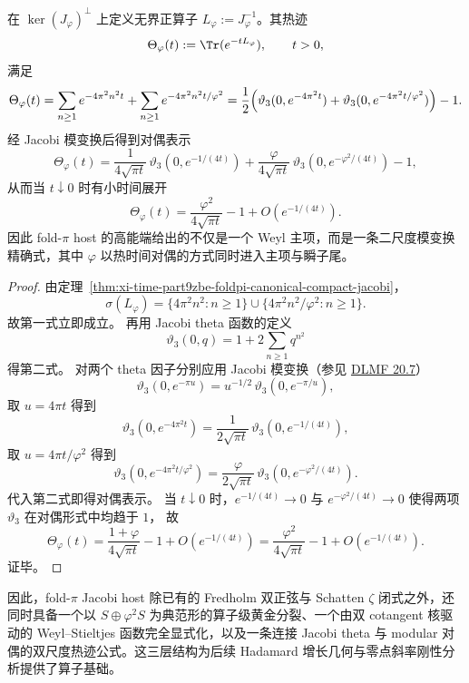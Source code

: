 \begin{theorem}\label{thm:xi-time-part9zbl-foldpi-inverse-host-theta-heat-trace}
在 \(\ker(J_\varphi)^\perp\) 上定义无界正算子 \(L_\varphi:=J_\varphi^{-1}\)。其热迹
\[
\Theta_\varphi(t):=\Tr(e^{-tL_\varphi}),
\qquad t>0,
\]
满足
\[
\Theta_\varphi(t)
=
\sum_{n\ge 1}e^{-4\pi^2n^2 t}
+\sum_{n\ge 1}e^{-4\pi^2n^2 t/\varphi^2}
=
\frac{1}{2}\Bigl(\vartheta_3(0,e^{-4\pi^2t})+\vartheta_3(0,e^{-4\pi^2t/\varphi^2})\Bigr)-1.
\]
经 Jacobi 模变换后得到对偶表示
\[
\Theta_\varphi(t)
=
\frac{1}{4\sqrt{\pi t}}\,\vartheta_3(0,e^{-1/(4t)})
+
\frac{\varphi}{4\sqrt{\pi t}}\,\vartheta_3(0,e^{-\varphi^2/(4t)})
-1,
\]
从而当 \(t\downarrow 0\) 时有小时间展开
\[
\Theta_\varphi(t)
=
\frac{\varphi^2}{4\sqrt{\pi t}}-1+O(e^{-1/(4t)}).
\]
因此 fold-\(\pi\) host 的高能端给出的不仅是一个 Weyl 主项，而是一条二尺度模变换精确式，其中 \(\varphi\) 以热时间对偶的方式同时进入主项与瞬子尾。
\end{theorem}
\begin{proof}
由定理~\ref{thm:xi-time-part9zbe-foldpi-canonical-compact-jacobi}，
\[
\sigma(L_\varphi)
=
\{4\pi^2n^2:n\ge 1\}\cup\{4\pi^2n^2/\varphi^2:n\ge 1\}.
\]
故第一式立即成立。
再用 Jacobi theta 函数的定义
\[
\vartheta_3(0,q)=1+2\sum_{n\ge 1}q^{n^2}
\]
得第二式。
对两个 theta 因子分别应用 Jacobi 模变换（参见 \href{https://dlmf.nist.gov/20.7}{DLMF 20.7}）
\[
\vartheta_3(0,e^{-\pi u})=u^{-1/2}\,\vartheta_3(0,e^{-\pi/u}),
\]
取 \(u=4\pi t\) 得到
\[
\vartheta_3(0,e^{-4\pi^2 t})
=
\frac{1}{2\sqrt{\pi t}}\,\vartheta_3(0,e^{-1/(4t)}),
\]
取 \(u=4\pi t/\varphi^2\) 得到
\[
\vartheta_3(0,e^{-4\pi^2 t/\varphi^2})
=
\frac{\varphi}{2\sqrt{\pi t}}\,\vartheta_3(0,e^{-\varphi^2/(4t)}).
\]
代入第二式即得对偶表示。
当 \(t\downarrow 0\) 时，\(e^{-1/(4t)}\to 0\) 与 \(e^{-\varphi^2/(4t)}\to 0\) 使得两项 \(\vartheta_3\) 在对偶形式中均趋于 \(1\)，
故
\[
\Theta_\varphi(t)
=
\frac{1+\varphi}{4\sqrt{\pi t}}-1+O(e^{-1/(4t)})
=
\frac{\varphi^2}{4\sqrt{\pi t}}-1+O(e^{-1/(4t)}).
\]
证毕。
\end{proof}

\noindent
因此，fold-\(\pi\) Jacobi host 除已有的 Fredholm 双正弦与 Schatten \(\zeta\) 闭式之外，还同时具备一个以 \(S\oplus \varphi^2 S\) 为典范形的算子级黄金分裂、一个由双 cotangent 核驱动的 Weyl--Stieltjes 函数完全显式化，以及一条连接 Jacobi theta 与 modular 对偶的双尺度热迹公式。这三层结构为后续 Hadamard 增长几何与零点斜率刚性分析提供了算子基础。

\endinput
